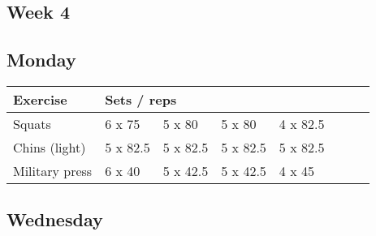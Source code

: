 \documentclass[12pt, a4paper]{article}%
\begin{document}
 \subsection*{\hspace{0.25em} Week 4 }
  \subsection*{\hspace{0.5em} Monday }


  \begin{tabular}{l|lllllll}
  \hspace{0.75em} \textbf{Exercise} & \multicolumn{ 7 }{l}{ \textbf{Sets / reps} } \\ \hline

            \hspace{0.75em} Squats
            & 6 x 75
            & 5 x 80
            & 5 x 80
            & 4 x 82.5
            & 
            & 
            & 
            \\


            \hspace{0.75em} Chins (light)
            & 5 x 82.5
            & 5 x 82.5
            & 5 x 82.5
            & 5 x 82.5
            & 
            & 
            & 
            \\


            \hspace{0.75em} Military press
            & 6 x 40
            & 5 x 42.5
            & 5 x 42.5
            & 4 x 45
            & 
            & 
            & 
            \\


  \end{tabular}

  \subsection*{\hspace{0.5em} Wednesday }
\end{document}
